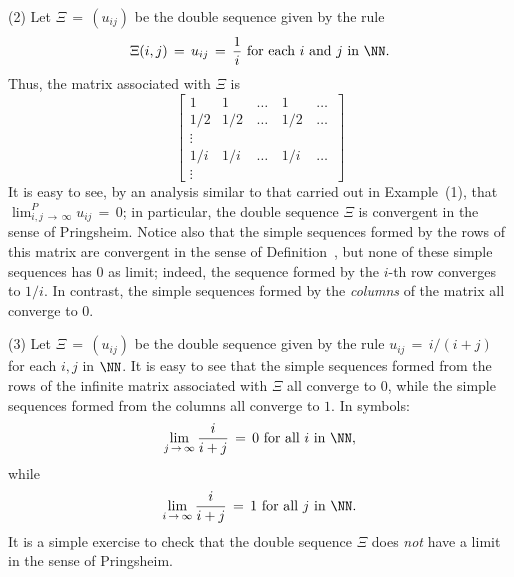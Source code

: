 {\V

        (2) Let ${\Xi} \,=\, (u_{ij})$ be the double sequence given by the rule
        \begin{displaymath}
        {\Xi}(i,j) \,=\, u_{ij} \,=\, \frac{1}{i} \mbox{ for each $i$ and $j$ in ${\NN}$}.
        \end{displaymath}
    Thus, the matrix associated with ${\Xi}$ is
        \begin{displaymath}
        \left[
        \begin{array}{llclc}
        1 & 1 & \,{\ldots}\,& 1 & \,{\ldots}\, \\
        1/2 & 1/2 & \,{\ldots}\,& 1/2 & \,{\ldots}\, \\
      {\vdots} &        &             &        &              \\
        1/i & 1/i & \,{\ldots}\,& 1/i & \,{\ldots}\, \\
      {\vdots} &        &             &        &
        \end{array}
                                \right]
        \end{displaymath}
    It is easy to see, by an analysis similar to that carried out in Example~(1), that $\lim_{i,j \,{\rightarrow}\, {\infty}}^{P} u_{ij} \,=\, 0$;
    in particular, the double sequence ${\Xi}$ is convergent in the sense of Pringsheim.
    Notice also that the simple sequences formed by the rows of this matrix are convergent in the sense of Definition~,
    but none of these simple sequences has $0$ as limit; indeed, the sequence formed by the $i$-th row converges to $1/i$.
    In contrast, the simple sequences formed by the {\em columns} of the matrix all converge to $0$.

\V

        (3) Let ${\Xi} \,=\, (u_{ij})$ be the double sequence given by the rule $u_{ij} \,=\, i/(i+j)$ for each $i,j$ in ${\NN}$.
    It is easy to see that the simple sequences formed from the rows of the infinite matrix associated with ${\Xi}$ all converge to $0$, while the simple sequences formed from the columns all converge to $1$.
    In symbols:
        \begin{displaymath}
        \lim_{j \,{\rightarrow}\, {\infty}} \frac{i}{i+j} \,=\, 0 \mbox{ for all $i$ in ${\NN}$},
        \end{displaymath}
    while
        \begin{displaymath}
        \lim_{i \,{\rightarrow}\, {\infty}} \frac{i}{i+j} \,=\, 1 \mbox{ for all $j$ in ${\NN}$}.
        \end{displaymath}
    It is a simple exercise to check that the double sequence ${\Xi}$ does {\em not} have a limit in the sense of Pringsheim.

}

